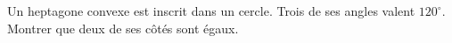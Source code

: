 Un heptagone convexe est inscrit dans un cercle. Trois de ses angles valent $120^\circ$. Montrer que deux de ses côtés sont égaux.
